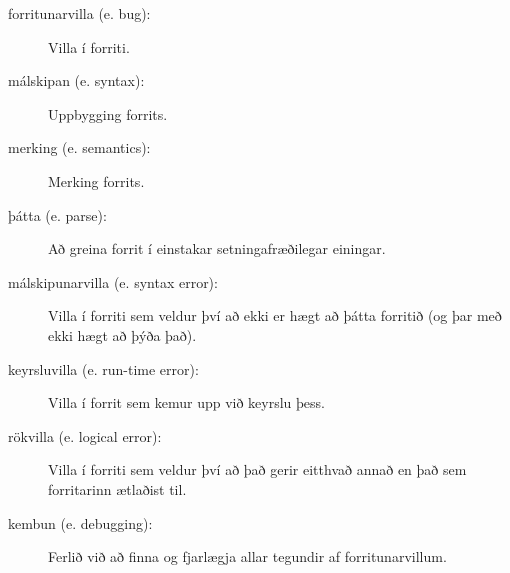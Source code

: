 \begin{description}
\item[forritunarvilla (e. bug):]  Villa í forriti.

\item[málskipan (e. syntax):]  Uppbygging forrits.

\item[merking (e. semantics):]  Merking forrits.

\item[þátta (e. parse):]  Að greina forrit í einstakar setningafræðilegar einingar.

\item[málskipunarvilla (e. syntax error):]  Villa í forriti sem veldur því að ekki er hægt að þátta forritið (og þar með ekki hægt að þýða það).

\item[keyrsluvilla (e. run-time error):]  Villa í forrit sem kemur upp við keyrslu þess. 

\item[rökvilla (e. logical error):]  Villa í forriti sem veldur því að það gerir eitthvað annað en það sem forritarinn ætlaðist til.

\item[kembun (e. debugging):]  Ferlið við að finna og fjarlægja allar tegundir af forritunarvillum.


\end{description}